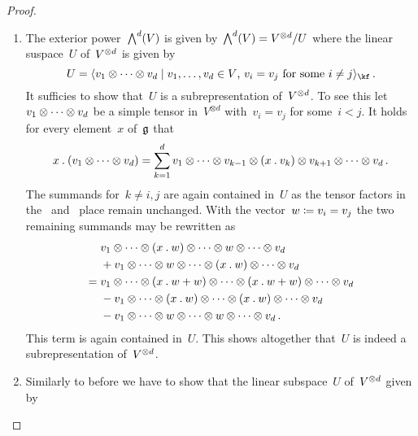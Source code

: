 \begin{proof}
  \leavevmode
  \begin{enumerate}
    \item
      The exterior power~$\operatorname{\bigwedge}^d(V)$ is given by~$\operatorname{\bigwedge}^d(V) = V^{\otimes d} / U$ where the linear suspace~$U$ of~$V^{\otimes d}$ is given by
      \[
        U
        =
        \gen{
          v_1 \tensor \dotsb \tensor v_d
        \suchthat
          \text{$v_1, \dotsc, v_d \in V$,~$v_i = v_j$ for some~$i \neq j$}
        }_{\kf} \,.
      \]
      It sufficies to show that~$U$ is a subrepresentation of~$V^{\otimes d}$.
      To see this let~$v_1 \otimes \dotsb \otimes v_d$ be a simple tensor in~$V^{\otimes d}$ with~$v_i = v_j$ for some~$i < j$.
      It holds for every element~$x$ of~$\mathfrak{g}$ that
      \[
        x \mathbin{.} (v_1 \otimes \dotsb \otimes v_d)
        =
        \sum_{k=1}^d v_1
        \otimes \dotsb \otimes v_{k-1}
        \otimes (x \mathbin{.} v_k)
        \otimes v_{k+1} \otimes \dotsb \otimes v_d  \,.
      \]
      The summands for~$k \neq i,j$ are again contained in~$U$ as the tensor factors in the~{} and~{} place remain unchanged.
      With the vector~$w \coloneqq v_i = v_j$ the two remaining summands may be rewritten as
      \begin{align*}
        {}&
          v_1 \otimes \dotsb
          \otimes (x \mathbin{.} w)
          \otimes \dotsb
          \otimes w
          \otimes \dotsb \otimes v_d
        \\
        {}&
        + v_1 \otimes \dotsb
          \otimes w
          \otimes \dotsb
          \otimes (x \mathbin{.} w)
          \otimes \dotsb \otimes v_d
        \\
        ={}&
          v_1 \otimes \dotsb
          \otimes (x \mathbin{.} w + w)
          \otimes \dotsb
          \otimes (x \mathbin{.} w + w)
          \otimes \dotsb \otimes v_d
        \\
        {}&
        - v_1 \otimes \dotsb
          \otimes (x \mathbin{.} w)
          \otimes \dotsb
          \otimes (x \mathbin{.} w)
          \otimes \dotsb \otimes v_d
        \\
        {}&
        - v_1 \otimes \dotsb
          \otimes w
          \otimes \dotsb
          \otimes w
          \otimes \dotsb \otimes v_d  \,.
      \end{align*}
      This term is again contained in~$U$.
      This shows altogether that~$U$ is indeed a subrepresentation of~$V^{\otimes d}$.
    \item
      Similarly to before we have to show that the linear subspace~$U$ of~$V^{\otimes d}$ given by

\end{enumerate}
\end{proof}
